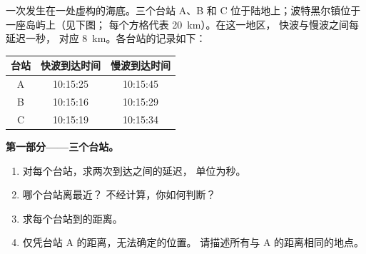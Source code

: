 \begin{problem}
\label{pb:g7:earthquakes:1}
一次发生在一处虚构的海底。三个台站
A、B 和 C 位于陆地上；波特黑尔镇位于一座岛屿上（见下图；
每个方格代表 \qty{20}{km}）。在这一地区，
快波与慢波之间每延迟一秒，
对应 \qty{8}{km}。各台站的记录如下：

\begin{center}
\small
\begin{tabular}{|c|c|c|}
\hline
\textbf{台站} & \textbf{快波到达时间} & \textbf{慢波到达时间} \\
\hline
A & 10:15:25 & 10:15:45 \\
B & 10:15:16 & 10:15:29 \\
C & 10:15:19 & 10:15:34 \\
\hline
\end{tabular}
\end{center}

\medskip
\noindent\textbf{第一部分——三个台站。}\par\nopagebreak
\begin{enumerate}[beginpenalty=10000]
  \item 对每个台站，求两次到达之间的延迟，
        单位为秒。
  \item 哪个台站离最近？
        不经计算，你如何判断？
  \item 求每个台站到的距离。
  \item 仅凭台站 A 的距离，无法确定的位置。
        请描述所有与 A 的距离相同的地点。
\end{enumerate}


\end{problem}
